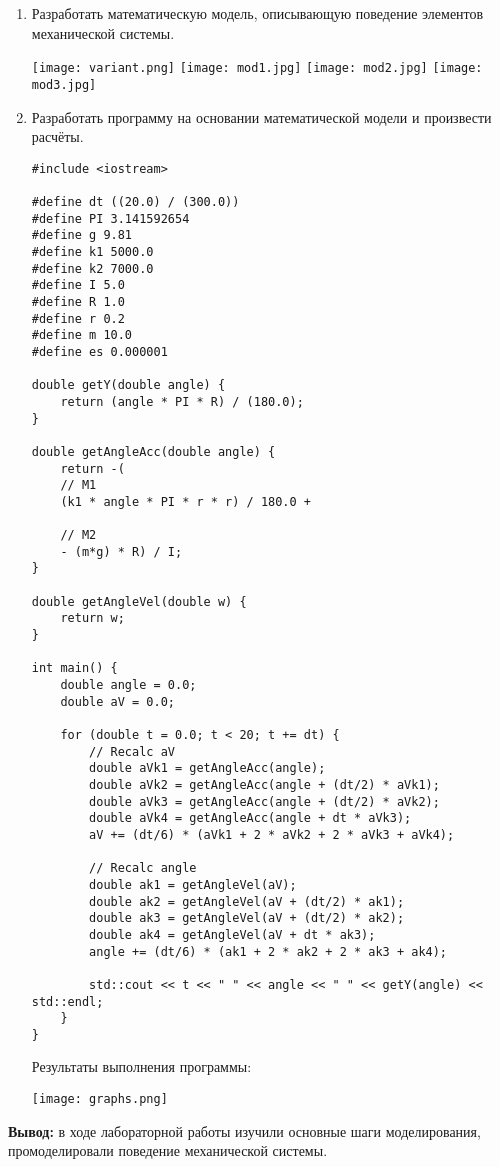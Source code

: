 \documentclass[a4paper,14pt]{extarticle}
\begin{document}
\begin{enumerate}[1. ]
    \item Разработать математическую модель, описывающую поведение элементов механической системы.\\
          \begin{center}
              \texttt{[image: variant.png]}
              \bigbreak
              \texttt{[image: mod1.jpg]}
              \texttt{[image: mod2.jpg]}
              \texttt{[image: mod3.jpg]}
          \end{center}
    \item Разработать программу на основании математической модели и произвести расчёты.
          \begin{verbatim}
#include <iostream>

#define dt ((20.0) / (300.0))
#define PI 3.141592654
#define g 9.81
#define k1 5000.0
#define k2 7000.0
#define I 5.0
#define R 1.0
#define r 0.2
#define m 10.0
#define es 0.000001

double getY(double angle) {
    return (angle * PI * R) / (180.0);
}

double getAngleAcc(double angle) {
    return -(
    // M1
    (k1 * angle * PI * r * r) / 180.0 +
        
    // M2
    - (m*g) * R) / I;
}

double getAngleVel(double w) {
    return w;
}

int main() {
    double angle = 0.0;
    double aV = 0.0;

    for (double t = 0.0; t < 20; t += dt) {
        // Recalc aV
        double aVk1 = getAngleAcc(angle);
        double aVk2 = getAngleAcc(angle + (dt/2) * aVk1);
        double aVk3 = getAngleAcc(angle + (dt/2) * aVk2);
        double aVk4 = getAngleAcc(angle + dt * aVk3);
        aV += (dt/6) * (aVk1 + 2 * aVk2 + 2 * aVk3 + aVk4);
        
        // Recalc angle
        double ak1 = getAngleVel(aV);
        double ak2 = getAngleVel(aV + (dt/2) * ak1);
        double ak3 = getAngleVel(aV + (dt/2) * ak2);
        double ak4 = getAngleVel(aV + dt * ak3);
        angle += (dt/6) * (ak1 + 2 * ak2 + 2 * ak3 + ak4);

        std::cout << t << " " << angle << " " << getY(angle) << std::endl;
    }
}
    \end{verbatim}
          Результаты выполнения программы:

          \begin{center}
            \texttt{[image: graphs.png]}
          \end{center}

\end{enumerate}

\textbf{Вывод: } в ходе лабораторной работы изучили основные шаги моделирования,
промоделировали поведение механической системы.
\end{document}
